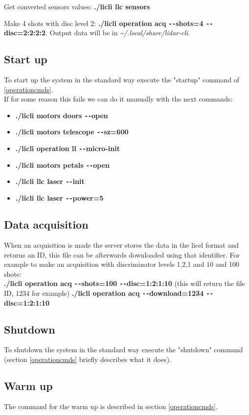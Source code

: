 \documentclass[letterpaper, 10 pt]{article}
\begin{document}
Get converted sensors values: \textbf{./licli llc sensors}

Make 4 shots with disc level 2: \textbf{./licli operation acq \texttt{-{}-}shots=4 \texttt{-{}-}disc=2:2:2:2}. Output data will be in \textit{\~{}/.local/share/lidar-cli}.

\subsection{Start up}
To start up the system in the standard way execute the "startup" command of \ref{operationcmds}.\\

If for some reason this fails we can do it manually with the next commands:
\begin{itemize}
	\item \textbf{./licli motors doors \texttt{-{}-}open}
	\item \textbf{./licli motors telescope \texttt{-{}-}sz=600}
	\item \textbf{./licli operation ll  \texttt{-{}-}micro-init}
	\item \textbf{./licli motors petals \texttt{-{}-}open}
	\item \textbf{./licli llc laser \texttt{-{}-}init}
	\item  \textbf{./licli llc laser \texttt{-{}-}power=5}
\end{itemize}
\subsection{Data acquisition}
When an acquisition is made the server stores the data in the licel format and returns an ID, this file can be afterwards downloaded using that identifier. For example to make an acquisition with discriminator levels 1,2,1 and 10 and 100 shots:\\
\textbf{./licli operation acq \texttt{-{}-}shots=100 \texttt{-{}-}disc=1:2:1:10}  (this will return the file ID, 1234 for example)
\textbf{./licli operation acq \texttt{-{}-}download=1234 \texttt{-{}-}disc=1:2:1:10}
\subsection{Shutdown}
To shutdown the system in the standard way execute the "shutdown" command (section \ref{operationcmds} briefly describes what it does). \\

\subsection{Warm up}
The command for the warm up is described in section \ref{operationcmds}.
\end{document}
